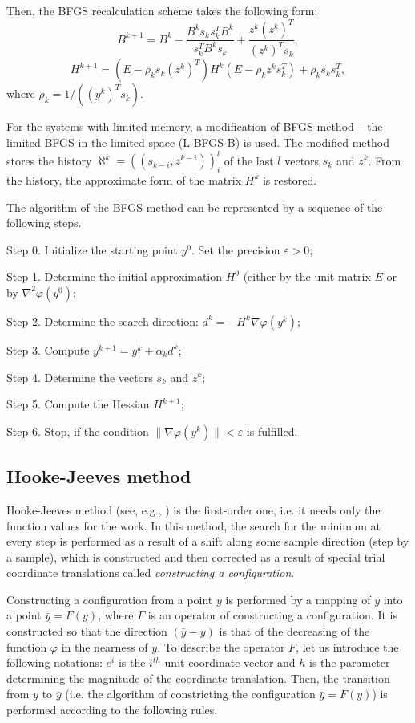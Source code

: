 \documentclass[runningheads]{llncs}
\begin{document}
Then, the BFGS recalculation scheme takes the following form:
$$ B^{k+1} = B^k - \frac{B^k s_k s_k^T B^k}{s_k^T B^k s_k} + \frac{z^k (z^k)^{T}}{(z^k)^{T} s_k},$$
$$ H^{k+1} = (E - \rho_k s_k (z^k)^{T}) H^k (E - \rho_k z^k s_k^T) + \rho_k s_k s_k^T,$$
where $\rho_k = 1/((y^k)^{T} s_k)$.

For the systems with limited memory, a modification of BFGS method -- the limited BFGS in the limited space (L-BFGS-B) is used. The modified method stores the history $\aleph^k = ((s_{k-i}, z^{k-i}))_i^l$ of the last $l$ vectors $s_k$ and $z^k$. From the history, the approximate form of the matrix $H^k$ is restored.

The algorithm of the BFGS method can be represented by a sequence of the following steps.

Step 0. Initialize the starting point $y^0$. Set the precision $\varepsilon > 0$;

Step 1. Determine the initial approximation $H^0$ (either by the unit matrix $E$ or by $\nabla^2 \varphi(y^0)$;

Step 2. Determine the search direction: $d^k = -H^k \nabla \varphi(y^k)$;

Step 3. Compute $y^{k+1} = y^k + \alpha_k d^k$;

Step 4. Determine the vectors $s_k$ and $z^k$;

Step 5. Compute the Hessian $H^{k+1}$;

Step 6. Stop, if the condition $\|\nabla \varphi(y^k)\| < \varepsilon$ is fulfilled.

\subsection{Hooke-Jeeves method}
Hooke-Jeeves method (see, e.g., \cite{Kelley}) is the first-order one, i.e. it needs only the function values for the work. In this method, the search for the minimum at every step is performed as a result of a shift along some sample direction (step by a sample), which is constructed and then corrected as a result of special trial coordinate translations called \textit{constructing a configuration}.

Constructing a configuration from a point $y$ is performed by a mapping of $y$ into a point $\bar{y} = F(y)$, where $F$ is an operator of constructing a configuration. It is constructed so that the direction $(\bar{y} - y)$ is that of the decreasing of the function $\varphi$ in the nearness of $y$. To describe the operator $F$, let us introduce the following notations: $e^i$ is the $i^{th}$ unit coordinate vector and $h$ is the parameter determining the magnitude of the coordinate translation. Then, the transition from $y$ to $\bar{y}$ (i.e. the algorithm of constricting the configuration $\bar{y} = F(y)$) is performed according to the following rules.
\end{document}
